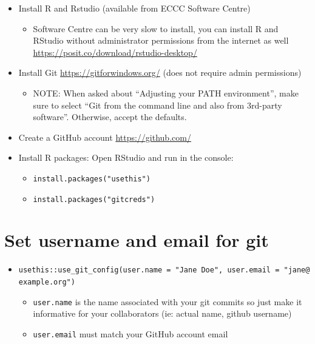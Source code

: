\documentclass[
  letterpaper,
  DIV=11,
  numbers=noendperiod]{scrreprt}
\providecommand{\tightlist}{%
  \setlength{\itemsep}{0pt}\setlength{\parskip}{0pt}}\usepackage{longtable,booktabs,array}
\begin{document}
\begin{itemize}
\item
  Install R and Rstudio (available from ECCC Software Centre)

  \begin{itemize}
  \tightlist
  \item
    Software Centre can be very slow to install, you can install R and
    RStudio without administrator permissions from the internet as well
    \url{https://posit.co/download/rstudio-desktop/}
  \end{itemize}
\item
  Install Git \url{https://gitforwindows.org/} (does not require admin
  permissions)

  \begin{itemize}
  \tightlist
  \item
    NOTE: When asked about ``Adjusting your PATH environment'', make
    sure to select ``Git from the command line and also from 3rd-party
    software''. Otherwise, accept the defaults.
  \end{itemize}
\item
  Create a GitHub account \url{https://github.com/}
\item
  Install R packages: Open RStudio and run in the console:

  \begin{itemize}
  \tightlist
  \item
    \texttt{install.packages("usethis")}
  \item
    \texttt{install.packages("gitcreds")}
  \end{itemize}
\end{itemize}

\hypertarget{set-username-and-email-for-git}{%
\section{Set username and email for
git}\label{set-username-and-email-for-git}}

\begin{itemize}
\tightlist
\item
  \texttt{usethis::use\_git\_config(user.name\ =\ "Jane\ Doe",\ user.email\ =\ "jane@example.org")}

  \begin{itemize}
  \tightlist
  \item
    \texttt{user.name} is the name associated with your git commits so
    just make it informative for your collaborators (ie: actual name,
    github username)
  \item
    \texttt{user.email} must match your GitHub account email
  \end{itemize}
\end{itemize}
\end{document}
